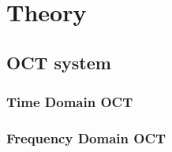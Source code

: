 \chapter{Theory}

\paragraph{}


\section{OCT system}
\paragraph{}

\paragraph{}

\paragraph{}

\paragraph{}

\subsection{Time Domain OCT}
\paragraph{}

\paragraph{}

\subsection{Frequency Domain OCT}
\paragraph{}


\paragraph{}


